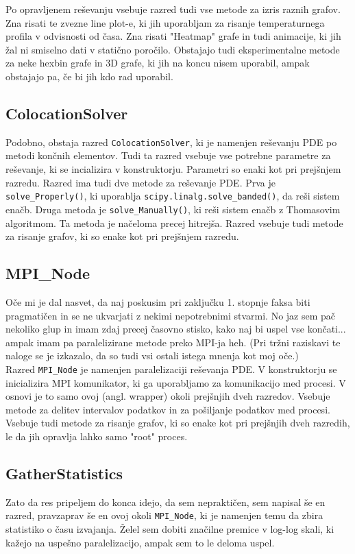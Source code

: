 \documentclass[a4paper]{article}
\begin{document}
Po opravljenem reševanju vsebuje razred tudi vse metode za izris raznih grafov. Zna risati te 
zvezne line plot-e, ki jih uporabljam za risanje temperaturnega profila v odvisnosti od časa. Zna
risati "Heatmap" grafe in tudi animacije, ki jih žal ni smiselno dati v statično poročilo. Obstajajo
tudi eksperimentalne metode za neke hexbin grafe in 3D grafe, ki jih na koncu nisem uporabil, ampak
obstajajo pa, če bi jih kdo rad uporabil.\\

\subsection{ColocationSolver}
Podobno, obstaja razred \texttt{ColocationSolver}, ki je namenjen reševanju PDE po metodi končnih
elementov. Tudi ta razred vsebuje vse potrebne parametre za reševanje, ki se incializira v 
konstruktorju. Parametri so enaki kot pri prejšnjem razredu. Razred ima tudi dve metode za
reševanje PDE. Prva je \texttt{solve\_Properly()}, ki uporablja \texttt{scipy.linalg.solve\_banded()},
da reši sistem enačb. Druga metoda je \texttt{solve\_Manually()}, ki reši sistem enačb z Thomasovim
algoritmom. Ta metoda je načeloma precej hitrejša. Razred vsebuje tudi metode za risanje grafov, ki so
enake kot pri prejšnjem razredu.\\


\subsection{MPI\_Node}
Oče mi je dal nasvet, da naj poskusim pri zaključku 1. stopnje faksa biti pragmatičen in se ne ukvarjati
z nekimi nepotrebnimi stvarmi. No jaz sem pač nekoliko glup in imam zdaj precej časovno stisko, kako
naj bi uspel vse končati... ampak imam pa paralelizirane metode preko MPI-ja heh. (Pri tržni raziskavi
te naloge se je izkazalo, da so tudi vsi ostali istega mnenja kot moj oče.)\\

Razred \texttt{MPI\_Node} je namenjen paralelizaciji reševanja PDE. V konstruktorju se inicializira
MPI komunikator, ki ga uporabljamo za komunikacijo med procesi. V osnovi je to samo ovoj (angl. wrapper)
okoli prejšnjih dveh razredov. Vsebuje metode za delitev intervalov podatkov in za pošiljanje podatkov
med procesi. Vsebuje tudi metode za risanje grafov, ki so enake kot pri prejšnjih dveh razredih, le da jih
opravlja lahko samo "root" proces.\\

\subsection{GatherStatistics}
Zato da res pripeljem do konca idejo, da sem nepraktičen, sem napisal še en razred, pravzaprav še en ovoj okoli
\texttt{MPI\_Node}, ki je namenjen temu da zbira statistiko o času izvajanja. Želel sem dobiti značilne premice
v log-log skali, ki kažejo na uspešno paralelizacijo, ampak sem to le deloma uspel.\\
\end{document}
